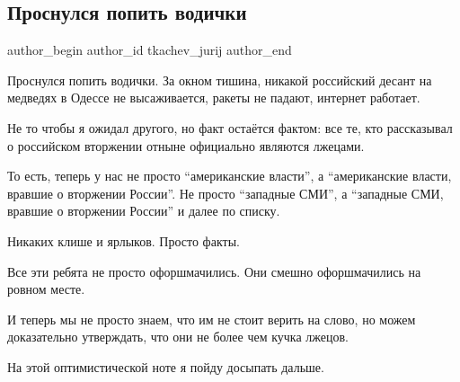  
 
 
 
 
 
\subsection{Проснулся попить водички}
\label{sec:16_02_2022.tg.tkachev_jurij.1.vodichka}
 
\ifcmt
 author_begin
   author_id tkachev_jurij
 author_end
\fi

Проснулся попить водички. За окном тишина, никакой российский десант на
медведях в Одессе не высаживается, ракеты не падают, интернет работает. 

Не то чтобы я ожидал другого, но факт остаётся фактом: все те, кто рассказывал
о российском вторжении отныне официально являются лжецами. 

То есть, теперь у нас не просто \enquote{американские власти}, а
\enquote{американские власти, вравшие о вторжении России}. Не просто
\enquote{западные СМИ}, а \enquote{западные СМИ, вравшие о вторжении России} и
далее по списку.

Никаких клише и ярлыков. Просто факты. 

Все эти ребята не просто офоршмачились. Они смешно офоршмачились на ровном
месте.

И теперь мы не просто знаем, что им не стоит верить на слово, но можем
доказательно утверждать, что они не более чем кучка лжецов.

На этой оптимистической ноте я пойду досыпать дальше.
